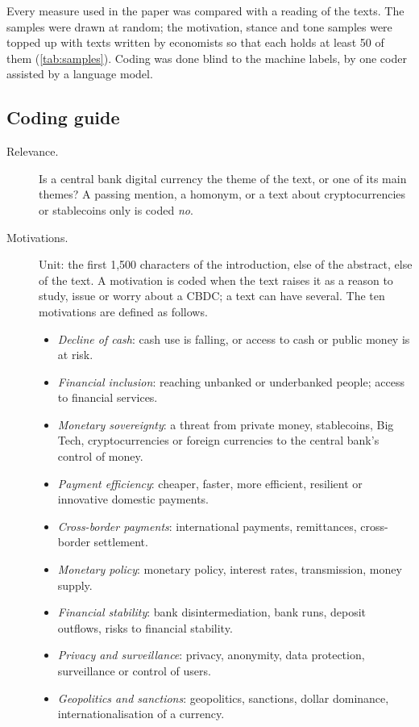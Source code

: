 \documentclass[11pt,a4paper]{article}
\begin{document}
Every measure used in the paper was compared with a reading of the texts. The samples were drawn at random; the motivation, stance and tone samples were topped up with texts written by economists so that each holds at least 50 of them (\cref{tab:samples}). Coding was done blind to the machine labels, by one coder assisted by a language model.



\subsection{Coding guide}
\begin{description}
\item[Relevance.] Is a central bank digital currency the theme of the text, or one of its main themes? A passing mention, a homonym, or a text about cryptocurrencies or stablecoins only is coded \emph{no}.
\item[Motivations.] Unit: the first 1{,}500 characters of the introduction, else of the abstract, else of the text. A motivation is coded when the text raises it as a reason to study, issue or worry about a CBDC; a text can have several. The ten motivations are defined as follows.
\begin{itemize}
\item \emph{Decline of cash}: cash use is falling, or access to cash or public money is at risk.
\item \emph{Financial inclusion}: reaching unbanked or underbanked people; access to financial services.
\item \emph{Monetary sovereignty}: a threat from private money, stablecoins, Big Tech, cryptocurrencies or foreign currencies to the central bank's control of money.
\item \emph{Payment efficiency}: cheaper, faster, more efficient, resilient or innovative domestic payments.
\item \emph{Cross-border payments}: international payments, remittances, cross-border settlement.
\item \emph{Monetary policy}: monetary policy, interest rates, transmission, money supply.
\item \emph{Financial stability}: bank disintermediation, bank runs, deposit outflows, risks to financial stability.
\item \emph{Privacy and surveillance}: privacy, anonymity, data protection, surveillance or control of users.
\item \emph{Geopolitics and sanctions}: geopolitics, sanctions, dollar dominance, internationalisation of a currency.

\end{itemize}
\end{description}
\end{document}
